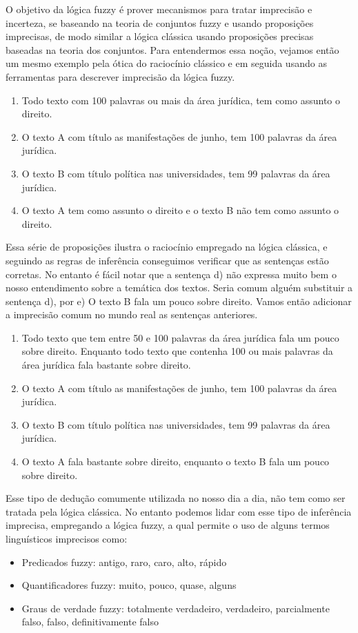 O objetivo da lógica fuzzy é prover mecanismos para tratar imprecisão e incerteza, se baseando na
teoria de conjuntos fuzzy e usando proposições imprecisas, de modo similar a lógica clássica usando
proposições precisas baseadas na teoria dos conjuntos.  Para entendermos essa noção, vejamos então
um mesmo exemplo pela ótica do raciocínio clássico e em seguida usando as ferramentas para descrever
imprecisão da lógica fuzzy.  \begin{enumerate}[label=\alph*)] \item Todo texto com 100 palavras ou
mais da área jurídica, tem como assunto o direito.  \item O texto A com título as manifestações
de junho, tem 100 palavras da área jurídica.  \item O texto B com título política nas
universidades, tem 99 palavras da área jurídica.  \item O texto A tem como assunto o direito e o
texto B não tem como assunto o direito.  \end{enumerate} Essa série de proposições ilustra o
raciocínio empregado na lógica clássica, e seguindo as regras de inferência conseguimos verificar
que as sentenças estão corretas. No entanto é fácil notar que a sentença d) não expressa muito bem o
nosso entendimento sobre a temática dos textos.  Seria comum alguém substituir a sentença d), por e)
O texto B fala um pouco sobre direito.  Vamos então adicionar a imprecisão comum no mundo real as
sentenças anteriores.  \begin{enumerate}[label=\alph*)] \item Todo texto que tem entre 50 e 100
palavras da área jurídica fala um pouco sobre direito.  Enquanto todo texto que contenha 100
ou mais palavras da área jurídica fala bastante sobre direito.  \item O texto A com título as
manifestações de junho, tem 100 palavras da área jurídica.  \item O texto B com título
política nas universidades, tem 99 palavras da área jurídica.  \item O texto A fala bastante
sobre direito, enquanto o texto B fala um pouco sobre direito.  \end{enumerate} Esse tipo de
dedução comumente utilizada no nosso dia a dia, não tem como ser tratada pela lógica
clássica. No entanto podemos lidar com esse tipo de inferência imprecisa, empregando a
lógica fuzzy, a qual permite o uso de alguns termos linguísticos imprecisos como:
\begin{itemize} \item Predicados fuzzy: antigo, raro, caro, alto, rápido \item Quantificadores
fuzzy: muito, pouco, quase, alguns \item Graus de verdade fuzzy: totalmente verdadeiro,
verdadeiro, parcialmente falso, falso, definitivamente falso \end{itemize}

